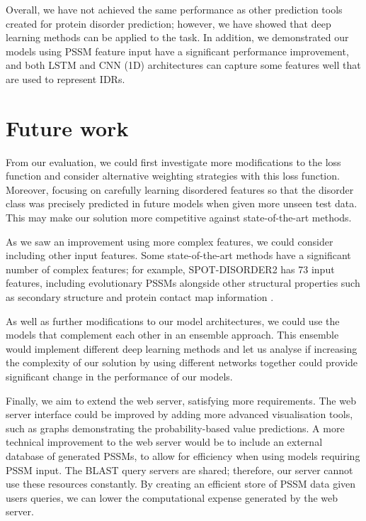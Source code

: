 \documentclass{l4proj}
\begin{document}
Overall, we have not achieved the same performance as other prediction tools created for protein disorder prediction; however, we have showed that deep learning methods can be applied to the task. In addition, we demonstrated our models using PSSM feature input have a significant performance improvement, and both LSTM and CNN (1D) architectures can capture some features well that are used to represent IDRs.

\section{Future work}

From our evaluation, we could first investigate more modifications to the loss function and consider alternative weighting strategies with this loss function. Moreover, focusing on carefully learning disordered features so that the disorder class was precisely predicted in future models when given more unseen test data. This may make our solution more competitive against state-of-the-art methods.

As we saw an improvement using more complex features, we could consider including other input features. Some state-of-the-art methods have a significant number of complex features; for example, SPOT-DISORDER2 has 73 input features, including evolutionary PSSMs alongside other structural properties such as secondary structure and protein contact map information \citep{Hanson:19}.

As well as further modifications to our model architectures, we could use the models that complement each other in an ensemble approach. This ensemble would implement different deep learning methods and let us analyse if increasing the complexity of our solution by using different networks together could provide significant change in the performance of our models.

Finally, we aim to extend the web server, satisfying more requirements. The web server interface could be improved by adding more advanced visualisation tools, such as graphs demonstrating the probability-based value predictions. A more technical improvement to the web server would be to include an external database of generated PSSMs, to allow for efficiency when using models requiring PSSM input. The BLAST query servers are shared; therefore, our server cannot use these resources constantly. By creating an efficient store of PSSM data given users queries, we can lower the computational expense generated by the web server.
\end{document}
